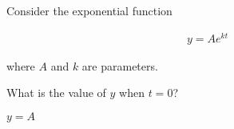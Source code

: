 Consider the exponential function

\begin{align*}
    y = Ae^{kt}
\end{align*}

where $A$ and $k$ are parameters.

What is the value of $y$ when $t=0$?

\begin{solution}
    $y=A$
\end{solution}